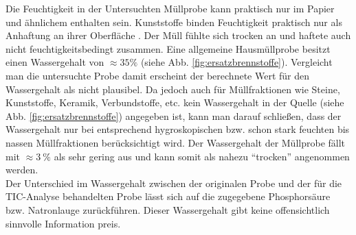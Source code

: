 Die Feuchtigkeit in der Untersuchten Müllprobe kann praktisch nur im Papier und ähnlichem enthalten sein. Kunststoffe binden Feuchtigkeit praktisch nur als Anhaftung an ihrer Oberfläche \cite[S.3]{LLA_Abfallanalyse}. Der Müll fühlte sich trocken an und haftete auch nicht feuchtigkeitsbedingt zusammen.
Eine allgemeine Hausmüllprobe besitzt einen Wassergehalt von $\approx 35\%$  (siehe Abb. \ref{fig:ersatzbrennstoffe}). Vergleicht man die untersuchte Probe damit erscheint der berechnete Wert für den Wassergehalt als nicht plausibel. Da jedoch auch für Müllfraktionen wie Steine, Kunststoffe, Keramik, Verbundstoffe, etc. kein Wassergehalt in der Quelle (siehe Abb. \ref{fig:ersatzbrennstoffe}) angegeben ist, kann man darauf schließen, dass der Wassergehalt nur bei entsprechend hygroskopischen bzw. schon stark feuchten bis nassen Müllfraktionen berücksichtigt wird. Der Wassergehalt der Müllprobe fällt mit $\approx \SI{3}{\percent}$ als sehr gering aus und kann somit als nahezu "`trocken"' angenommen werden.\\
Der Unterschied im Wassergehalt zwischen der originalen Probe und der für die TIC-Analyse behandelten Probe lässt sich auf die zugegebene Phosphorsäure bzw. Natronlauge zurückführen. Dieser Wassergehalt gibt keine offensichtlich sinnvolle Information preis.

